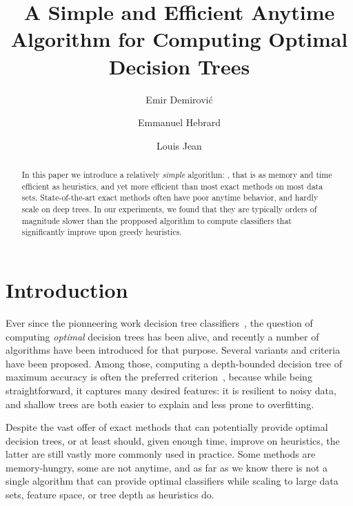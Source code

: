 \documentclass{llncs}
\title{A Simple and Efficient Anytime Algorithm for Computing Optimal Decision Trees}
\author{Emir Demirovi\'c\inst{1} \and Emmanuel Hebrard\inst{2} \and Louis Jean\inst{2}}
\institute{TU DELFT, The Netherlands, email: e.demirovic@tudelft.nl
  \and LAAS-CNRS, Universit\'e de Toulouse, CNRS, France, email: \{hebrard,ljean\}@laas.fr}
\begin{document}
\maketitle






\begin{abstract}
	In this paper we introduce a relatively \emph{simple} algorithm: \budalg, that is as memory and time efficient as heuristics, and yet more efficient than most exact methods on most data sets. State-of-the-art exact methods often have poor anytime behavior, and hardly scale on deep trees. In our experiments, we found that they are typically orders of magnitude slower than the propposed algorithm to compute classifiers that significantly improve upon greedy heuristics. 
\end{abstract}

\section{Introduction}

Ever since the pionneering work decision tree classifiers~\cite{breiman1984classification,10.1023/A:1022643204877}, the question of computing \emph{optimal} decision trees has been alive, and recently a number of algorithms have been introduced for that purpose.
Several variants and criteria have been proposed. %
Among those, computing a depth-bounded decision tree of maximum accuracy is often the preferred criterion~\cite{bertsimas2017optimal,hu2019optimal,dl8,verhaeghe2019learning}, because while being straightforward, it captures many desired features: it is resilient to noisy data, and shallow trees are both easier to explain and less prone to overfitting.

\medskip

Despite the vast offer of exact methods that can potentially provide optimal decision trees, or at least should, given enough time, improve on heuristics, the latter are still vastly more commonly used in practice. Some methods are memory-hungry, some are not anytime, and as far as we know there is not a single algorithm that can provide optimal classifiers while scaling to large data sets, feature space, or tree depth as heuristics do.
\end{document}
